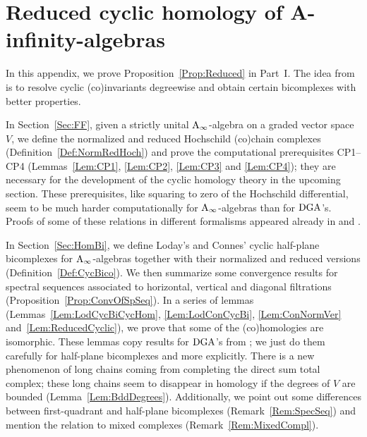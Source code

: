 \documentclass[\MainFolder/Text.tex]{subfiles}
\begin{document}
\chapter{Reduced cyclic homology of A-infinity-algebras}

In this appendix, we prove Proposition~\ref{Prop:Reduced} in Part~I. The idea from \cite{LodayCyclic} is to resolve cyclic (co)invariants degreewise and obtain certain bicomplexes with better properties.

In Section~\ref{Sec:FF}, given a strictly unital $\mathrm{A}_\infty$-algebra on a graded vector space $V$, we define the normalized and reduced Hochschild (co)chain complexes (Definition~\ref{Def:NormRedHoch}) and prove the computational prerequisites CP1--CP4 (Lemmas~\ref{Lem:CP1}, \ref{Lem:CP2}, \ref{Lem:CP3} and \ref{Lem:CP4}); they are necessary for the development of the cyclic homology theory in the upcoming section. These prerequisites, like squaring to zero of the Hochschild differential, seem to be much harder computationally for $\mathrm{A}_\infty$-algebras than for $\mathrm{DGA}$'s. Proofs of some of these relations in different formalisms appeared already in \cite{Mescher2016} and \cite{Lazarev2003}.

In Section~\ref{Sec:HomBi}, we define Loday's and Connes' cyclic half-plane bicomplexes for $\mathrm{A}_\infty$-algebras together with their normalized and reduced versions (Definition~\ref{Def:CycBico}). We then summarize some convergence results for spectral sequences associated to horizontal, vertical and diagonal filtrations (Proposition~\ref{Prop:ConvOfSpSeq}). In a series of lemmas (Lemmas~\ref{Lem:LodCycBiCycHom}, \ref{Lem:LodConCycBi}, \ref{Lem:ConNormVer} and~\ref{Lem:ReducedCyclic}), we prove that some of the (co)homologies are isomorphic. These lemmas copy results for $\mathrm{DGA}$'s from \cite{LodayCyclic}; we just do them carefully for half-plane bicomplexes and more explicitly. There is a new phenomenon of long chains coming from completing the direct sum total complex; these long chains seem to disappear in homology if the degrees of $V$ are bounded (Lemma~\ref{Lem:BddDegrees}). Additionally, we point out some differences between first-quadrant and half-plane bicomplexes (Remark~\ref{Rem:SpecSeq}) and mention the relation to mixed complexes (Remark~\ref{Rem:MixedCompl}).
\end{document}
